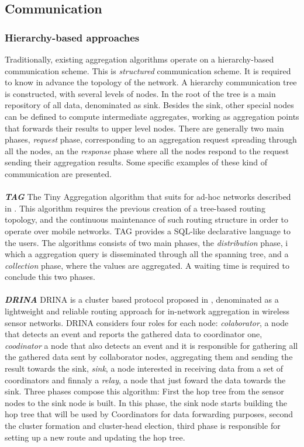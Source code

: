 \subsection{Communication}

\subsubsection{Hierarchy-based approaches} 
Traditionally, existing aggregation algorithms operate on a hierarchy-based communication scheme. This is \textit{structured} communication scheme. It is required to know in advance the topology of the network. A hierarchy communication tree is constructed, with several levels of nodes. In the root of the tree is a main repository of all data, denominated as sink. Besides the sink, other special nodes can be defined to compute intermediate aggregates, working as aggregation points that forwards their results to upper level nodes. There are generally two main phases, \textit{request} phase, corresponding to an aggregation request spreading through all the nodes, an the \textit{response} phase where all the nodes respond to the request sending their aggregation results. Some specific examples of these kind of communication are presented.\\
\\
\textbf{\textit{TAG}} The Tiny Aggregation algorithm that suits for ad-hoc networks described in \cite{madden2002tag}. This algorithm requires the previous creation of a tree-based routing topology, and the continuous maintenance of such routing structure in order to operate over mobile networks. TAG provides a SQL-like declarative language to the users. The algorithms consists of two main phases, the \textit{distribution} phase, i which a aggregation query is disseminated through all the spanning tree, and a \textit{collection} phase, where the values are aggregated. A waiting time is required to conclude this two phases.\\
\\ 
\textbf{\textit{DRINA}} DRINA is a cluster based protocol proposed in \cite{villas2013drina}, denominated as a lightweight and reliable routing approach for in-network aggregation in wireless sensor networks. DRINA considers four roles for each node: \textit{colaborator}, a node that detects an event and reports the gathered data to coordinator one, \textit{coodinator} a node that also detects an event and it is responsible for gathering all the gathered data sent by collaborator nodes, aggregating them and sending the result towards the sink, \textit{sink}, a node interested in receiving data from a set of coordinators and finnaly a \textit{relay}, a node that just foward the data towards the sink. Three phases compose this algorithm: First the hop tree from the sensor nodes to the sink node is built. In this phase, the sink node starts building the hop tree that will be used by Coordinators for data forwarding purposes, second the cluster formation and cluster-head election, third phase is responsible for setting up a new route and updating the hop tree. 

